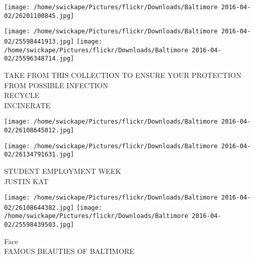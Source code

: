 \documentclass[10pt,letterpaper]{article}
\begin{document}
\texttt{[image: /home/swickape/Pictures/flickr/Downloads/Baltimore 2016-04-02/26201100845.jpg]}

\vspace{0.25in}
\texttt{[image: /home/swickape/Pictures/flickr/Downloads/Baltimore 2016-04-02/25598441913.jpg]}
\texttt{[image: /home/swickape/Pictures/flickr/Downloads/Baltimore 2016-04-02/25596348714.jpg]}

TAKE FROM THIS COLLECTION TO ENSURE YOUR PROTECTION FROM POSSIBLE INFECTION\\
RECYCLE\\
INCINERATE\\
\pagebreak

\texttt{[image: /home/swickape/Pictures/flickr/Downloads/Baltimore 2016-04-02/26108645012.jpg]}

\vspace{0.25in}
\texttt{[image: /home/swickape/Pictures/flickr/Downloads/Baltimore 2016-04-02/26134791631.jpg]}

STUDENT EMPLOYMENT WEEK\\
JUSTIN KAT\\
\pagebreak

\texttt{[image: /home/swickape/Pictures/flickr/Downloads/Baltimore 2016-04-02/26108644382.jpg]}
\texttt{[image: /home/swickape/Pictures/flickr/Downloads/Baltimore 2016-04-02/25598439503.jpg]}

Face\\
FAMOUS BEAUTIES OF BALTIMORE\\
\pagebreak
\end{document}
